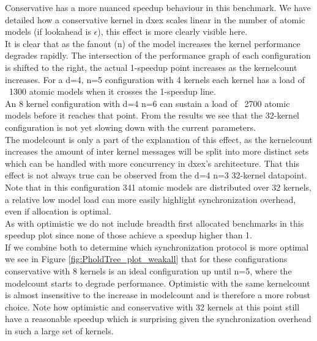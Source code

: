 Conservative has a more nuanced speedup behaviour in this benchmark. We have detailed how a conservative kernel in dxex scales linear in the number of atomic models (if lookahead is $\epsilon$), this effect is more clearly visible here. \\
It is clear that as the fanout (n) of the model increases the kernel performance degrades rapidly. The intersection of the performance graph of each configuration is shifted to the right, the actual 1-speedup point increases as the kernelcount increases. For a d=4, n=5 configuration with 4 kernels each kernel has a load of ~1300 atomic models when it crosses the 1-speedup line. \\
An 8 kernel configuration with d=4 n=6 can sustain a load of ~2700 atomic models before it reaches that point. From the results we see that the 32-kernel configuration is not yet slowing down with the current parameters. \\
The modelcount is only a part of the explanation of this effect, as the kernelcount increases the amount of inter kernel messages will be split into more distinct sets which can be handled with more concurrency in dxex's architecture.
That this effect is not always true can be observed from the d=4 n=3 32-kernel datapoint. Note that in this configuration 341 atomic models are distributed over 32 kernels, a relative low model load can more easily highlight synchronization overhead, even if allocation is optimal.\\
As with optimistic we do not include breadth first allocated benchmarks in this speedup plot since none of those achieve a speedup higher than 1.
\\
If we combine both to determine which synchronization protocol is more optimal we see in Figure \ref{fig:PholdTree_plot_weakall} that for these configurations conservative with 8 kernels is an ideal configuration up until n=5, where the modelcount starts to degrade performance. Optimistic with the same kernelcount is almost insensitive to the increase in modelcount and is therefore a more robust choice. Note how optimistic and conservative with 32 kernels at this point still have a reasonable speedup which is surprising given the synchronization overhead in such a large set of kernels.
